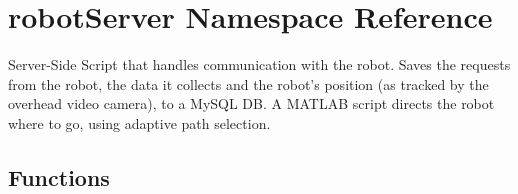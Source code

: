 \hypertarget{namespacerobot_server}{\section{robot\+Server Namespace Reference}
\label{namespacerobot_server}
}


Server-\/\+Side Script that handles communication with the robot. Saves the requests from the robot, the data it collects and the robot's position (as tracked by the overhead video camera), to a My\+S\+Q\+L D\+B. A M\+A\+T\+L\+A\+B script directs the robot where to go, using adaptive path selection.  


\subsection*{Functions}
